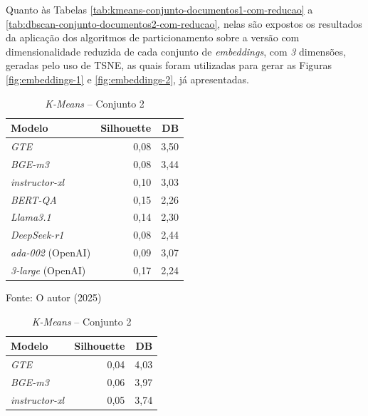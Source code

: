 Quanto às Tabelas \ref{tab:kmeans-conjunto-documentos1-com-reducao} a \ref{tab:dbscan-conjunto-documentos2-com-reducao}, nelas são expostos os resultados da aplicação dos algoritmos de particionamento sobre a versão com dimensionalidade reduzida de cada conjunto de \textit{embeddings}, com \textit{3} dimensões, geradas pelo uso de \ac{TSNE}, as quais foram utilizadas para gerar as Figuras \ref{fig:embeddings-1} e \ref{fig:embeddings-2}, já apresentadas. 

\begin{table}[H]
    \centering
    \begin{minipage}{0.48\textwidth}
        \caption{\textit{K-Means} -- Conjunto 1}
        \centering
        \begin{tabular}{ l r r }
            \hline
            \textbf{Modelo} & \textbf{Silhouette} & \textbf{DB} \\  
            \hline
            \textit{GTE} & 0,08 & 3,50 \\
            \textit{BGE-m3} & 0,08 & 3,44 \\
            \textit{instructor-xl} & 0,10 & 3,03 \\
            \textit{BERT-QA} & 0,15 & 2,26 \\
            \textit{Llama3.1} & 0,14 & 2,30 \\
            \textit{DeepSeek-r1} & 0,08 & 2,44 \\
            \textit{ada-002} (OpenAI) & 0,09 & 3,07 \\
            \textit{3-large} (OpenAI) & 0,17 & 2,24 \\
            \hline
        \end{tabular}
        \vspace{2mm}
        \small Fonte: O autor (2025)
        \label{tab:kmeans-conjunto-documentos1-sem-reducao}
    \end{minipage}
    \hfill
    \begin{minipage}{0.48\textwidth}
        \caption{\textit{K-Means} -- Conjunto 2}
        \centering
        \begin{tabular}{ l r r }
            \hline
            \textbf{Modelo} & \textbf{Silhouette} & \textbf{DB} \\  
            \hline
            \textit{GTE} & 0,04 & 4,03 \\
            \textit{BGE-m3} & 0,06 & 3,97 \\
            \textit{instructor-xl} & 0,05 & 3,74 \\

\end{tabular}
\end{minipage}
\end{table}
